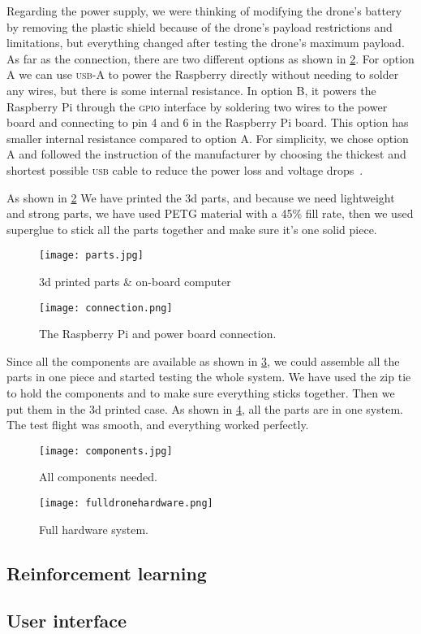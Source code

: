 \documentclass[../main.tex]{subfiles}
\begin{document}
Regarding the power supply, we were thinking 
of modifying the drone's battery by removing the 
plastic shield because of the drone's payload restrictions 
and limitations, but everything changed after testing 
the drone's maximum payload.
As far as the connection, there are 
two different options as shown in \cref{fig:connection}.
For option A we can use \textsc{usb}-A to power the Raspberry directly 
without needing to solder any wires, but there is some internal resistance.
In option B, it powers the Raspberry Pi through the \textsc{gpio} 
interface by soldering two wires to the power board and 
connecting to pin 4 and 6 in the Raspberry Pi board.
This option has smaller internal resistance compared to option A.
For simplicity, we chose option A and   
followed the instruction of the manufacturer by choosing 
the thickest and shortest possible \textsc{usb} cable to reduce 
the power loss and voltage drops~\cite{makerfocus}.

As shown in \cref{fig:connection} We have printed the 3d 
parts, and because we need lightweight and strong parts, 
we have used PETG material with a 45\% fill rate, 
then we used superglue to stick all the parts together 
and make sure it's one solid piece.

\begin{figure}[p]
	\centering
	\texttt{[image: parts.jpg]}
	\caption{3d printed parts \& on-board computer}
	\label{fig:printed-parts}
\end{figure} 

\begin{figure}[p]
	\centering
	\texttt{[image: connection.png]}
	\caption{The Raspberry Pi and power board connection.}
	\label{fig:connection}
\end{figure}  

Since all the components are available as shown 
in \cref{fig:components}, we could assemble 
all the parts in one piece and started testing the whole system.
We have used the zip tie to hold the components and to
make sure everything sticks together. Then we put them in the 3d
printed case. As shown in 
\cref{fig:full-hardware}, all the parts are in one system. 
The test flight was smooth, and everything worked perfectly. 

\begin{figure}[p]
	\centering
	\texttt{[image: components.jpg]}
	\caption{All components needed.}
	\label{fig:components}
\end{figure}

\begin{figure}[h]
	\centering
	\texttt{[image: fulldronehardware.png]}
	\caption{Full hardware system.}
	\label{fig:full-hardware}
\end{figure}  



\subsection{Reinforcement learning}

\lipsum[1]

\subsection{User interface}

\lipsum[1]
\end{document}
